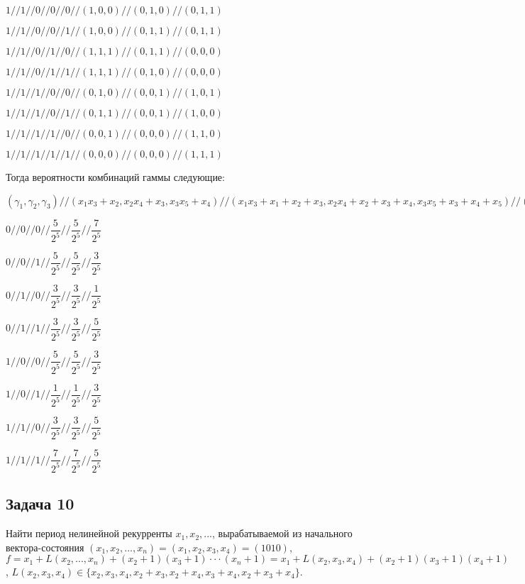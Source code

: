 \documentclass[utf8x, 14pt]{G7-32} %
\begin{document}
$1 // 1 // 0 // 0 // 0 // (1,0,0) // (0,1,0) // (0,1,1)$

$1 // 1 // 0 // 0 // 1 // (1,0,0) // (0,1,1) // (0,1,1)$

$1 // 1 // 0 // 1 // 0 // (1,1,1) // (0,1,1) // (0,0,0)$

$1 // 1 // 0 // 1 // 1 // (1,1,1) // (0,1,0) // (0,0,0)$

$1 // 1 // 1 // 0 // 0 // (0,1,0) // (0,0,1) // (1,0,1)$

$1 // 1 // 1 // 0 // 1 // (0,1,1) // (0,0,1) // (1,0,0)$

$1 // 1 // 1 // 1 // 0 // (0,0,1) // (0,0,0) // (1,1,0)$

$1 // 1 // 1 // 1 // 1 // (0,0,0) // (0,0,0) // (1,1,1)$

Тогда вероятности комбинаций гаммы следующие:

$(\gamma_1,\gamma_2,\gamma_3)// (x_1 x_3 + x_2, x_2 x_4 + x_3, x_3 x_5 + x_4) // (x_1 x_3+x_1+x_2+x_3, x_2 x_4+x_2+x_3+x_4, x_3 x_5+x_3+x_4+x_5) // (x_1 x_3+x_2+1, x_2 x_4+x_3+1, x_3 x_5+x_4+1)$

$0//0//0//\dfrac{5}{2^5}//\dfrac{5}{2^5}//\dfrac{7}{2^5}$

$0//0//1//\dfrac{5}{2^5}//\dfrac{5}{2^5}//\dfrac{3}{2^5}$

$0//1//0//\dfrac{3}{2^5}//\dfrac{3}{2^5}//\dfrac{1}{2^5}$

$0//1//1//\dfrac{3}{2^5}//\dfrac{3}{2^5}//\dfrac{5}{2^5}$

$1//0//0//\dfrac{5}{2^5}//\dfrac{5}{2^5}//\dfrac{3}{2^5}$

$1//0//1//\dfrac{1}{2^5}//\dfrac{1}{2^5}//\dfrac{3}{2^5}$

$1//1//0//\dfrac{3}{2^5}//\dfrac{3}{2^5}//\dfrac{5}{2^5}$

$1//1//1//\dfrac{7}{2^5}//\dfrac{7}{2^5}//\dfrac{5}{2^5}$

\subsection{Задача 10}
Найти период нелинейной рекурренты $x_1,x_2,...$, вырабатываемой из начального вектора-состояния $(x_1,x_2,...,x_n)= (x_1,x_2,x_3,x_4)=(1010)$, $f=x_1+L(x_2,...,x_n)+(x_2+1)(x_3+1)\cdot\cdot\cdot(x_n+1) = x_1+ L(x_2,x_3,x_4)+(x_2+1)(x_3+1)(x_4+1)$, $L(x_2,x_3,x_4)\in\{x_2,x_3,x_4,x_2+x_3,x_2+x_4,x_3+x_4,x_2+x_3+x_4\}$.
\end{document}
